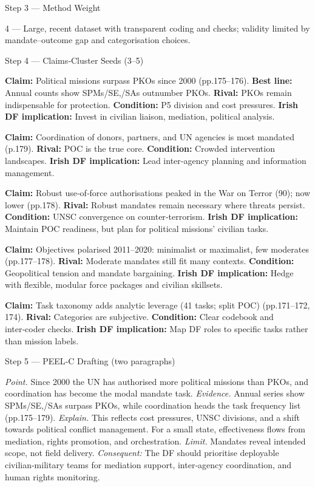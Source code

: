Step 3 — Method Weight

4 — Large, recent dataset with transparent coding and checks; validity limited by mandate–outcome gap and categorisation choices.

Step 4 — Claims‑Cluster Seeds (3–5)

\textbf{Claim:} Political missions surpass PKOs since 2000 (pp.175–176). \textbf{Best line:} Annual counts show SPMs/SE,/SAs outnumber PKOs. \textbf{Rival:} PKOs remain indispensable for protection. \textbf{Condition:} P5 division and cost pressures. \textbf{Irish DF implication:} Invest in civilian liaison, mediation, political analysis.

\textbf{Claim:} Coordination of donors, partners, and UN agencies is most mandated (p.179). \textbf{Rival:} POC is the true core. \textbf{Condition:} Crowded intervention landscapes. \textbf{Irish DF implication:} Lead inter‑agency planning and information management.

\textbf{Claim:} Robust use‑of‑force authorisations peaked in the War on Terror (90); now lower (pp.178). \textbf{Rival:} Robust mandates remain necessary where threats persist. \textbf{Condition:} UNSC convergence on counter‑terrorism. \textbf{Irish DF implication:} Maintain POC readiness, but plan for political missions’ civilian tasks.

\textbf{Claim:} Objectives polarised 2011–2020: minimalist or maximalist, few moderates (pp.177–178). \textbf{Rival:} Moderate mandates still fit many contexts. \textbf{Condition:} Geopolitical tension and mandate bargaining. \textbf{Irish DF implication:} Hedge with flexible, modular force packages and civilian skillsets.

\textbf{Claim:} Task taxonomy adds analytic leverage (41 tasks; split POC) (pp.171–172, 174). \textbf{Rival:} Categories are subjective. \textbf{Condition:} Clear codebook and inter‑coder checks. \textbf{Irish DF implication:} Map DF roles to specific tasks rather than mission labels.

Step 5 — PEEL‑C Drafting (two paragraphs)

\textit{Point.} Since 2000 the UN has authorised more political missions than PKOs, and coordination has become the modal mandate task. \textit{Evidence.} Annual series show SPMs/SE,/SAs surpass PKOs, while coordination heads the task frequency list (pp.175–179). \textit{Explain.} This reflects cost pressures, UNSC divisions, and a shift towards political conflict management. For a small state, effectiveness flows from mediation, rights promotion, and orchestration. \textit{Limit.} Mandates reveal intended scope, not field delivery. \textit{Consequent:} The DF should prioritise deployable civilian‑military teams for mediation support, inter‑agency coordination, and human rights monitoring.

